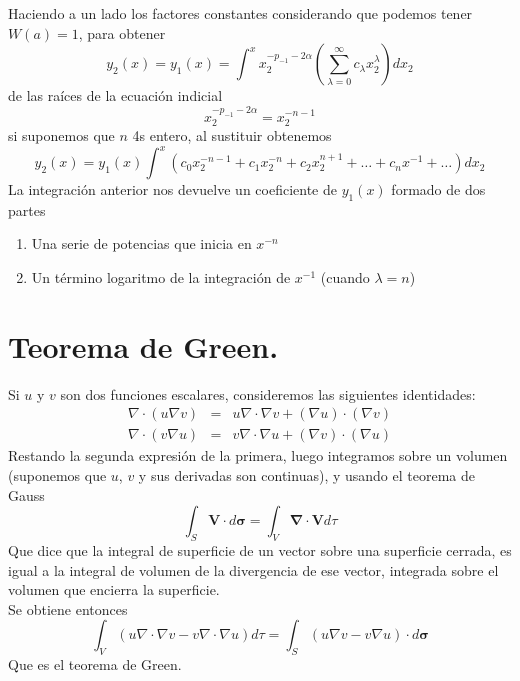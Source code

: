 Haciendo a un lado los factores constantes considerando que podemos tener $W(a)=1$, para obtener
\begin{equation}
y_{2}(x) =  y_{1}(x) = \int^{x} x_{2}^{-p_{-1}-2 \alpha} \left( \sum_{\lambda=0}^{\infty} c_{\lambda} x_{2}^{\lambda} \right) dx_{2} 
\end{equation}
de las raíces de la ecuación indicial
\begin{equation}
x_{2}^{-p_{-1} - 2 \alpha} = x_{2}^{-n-1}
\end{equation}
si suponemos que $n$ 4s entero, al sustituir obtenemos
\begin{equation}
y_{2}(x) = y_{1}(x) \int^{x} (c_{0} x_{2}^{-n-1} + c_{1} x_{2}^{-n} + c_{2} x_{2}^{n+1} + \ldots + c_{n} x^{-1} + \ldots ) dx_{2}
\end{equation}
La integración anterior nos devuelve un coeficiente de $y_{1}(x)$ formado de dos partes
\begin{enumerate}
\item Una serie de potencias que inicia en $x^{-n}$
\item Un término logaritmo de la integración de $x^{-1}$ (cuando $\lambda=n$)
\end{enumerate}
\section{Teorema de Green.}
Si $u$ y $v$ son dos funciones escalares, consideremos las siguientes identidades:
\begin{eqnarray}
\nabla \cdot ( u \nabla v) &=& u \nabla \cdot \nabla v + (\nabla u) \cdot (\nabla v) \\
\nabla \cdot ( v \nabla u) &=& v \nabla \cdot \nabla u + (\nabla v) \cdot (\nabla u)
\end{eqnarray}
Restando la segunda expresión de la primera, luego integramos sobre un volumen (suponemos que $u$, $v$ y sus derivadas son continuas), y usando el teorema de Gauss
\begin{equation}
\int_{S} \mathbf{V} \cdot d \bm{\sigma} = \int_{V} \mathbf{\nabla} \cdot \mathbf{V} d \tau
\end{equation}
Que dice que la integral de superficie de un vector sobre una superficie cerrada, es igual a la integral de volumen de la divergencia de ese vector, integrada sobre el volumen que encierra la superficie.
\\
Se obtiene entonces
\begin{equation}
\int_{V} (u \nabla \cdot \nabla v - v \nabla \cdot \nabla u) d \tau = \int_{S} (u \nabla v - v \nabla u) \cdot d \bm{\sigma}
\end{equation}
Que es el teorema de Green.
